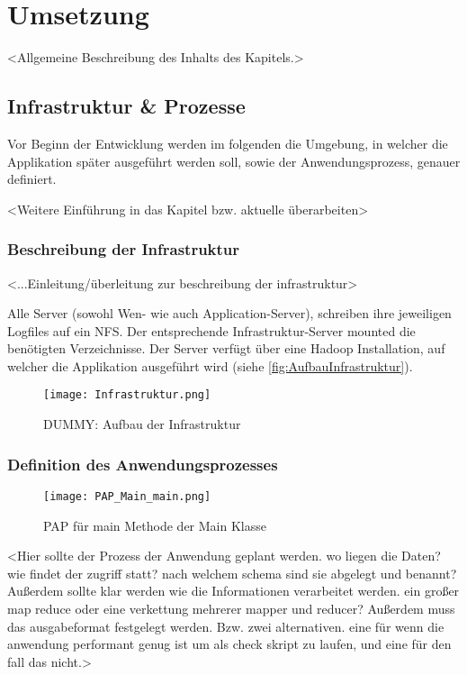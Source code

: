 
\chapter{Umsetzung}\label{cha:Umsetzung}
<Allgemeine Beschreibung des Inhalts des Kapitels.>

\section{Infrastruktur \& Prozesse}
Vor Beginn der Entwicklung werden im folgenden die Umgebung, in welcher die Applikation später ausgeführt werden soll, sowie der Anwendungsprozess, genauer definiert. 

<Weitere Einführung in das Kapitel bzw. aktuelle überarbeiten>

\subsection{Beschreibung der Infrastruktur}
<...Einleitung/überleitung zur beschreibung der infrastruktur>

Alle Server (sowohl Wen- wie auch Application-Server), schreiben ihre jeweiligen Logfiles auf ein \ac{NFS}. Der entsprechende Infrastruktur-Server mounted die benötigten Verzeichnisse. Der Server verfügt über eine Hadoop Installation, auf welcher die Applikation ausgeführt wird (siehe \autoref{fig:AufbauInfrastruktur}).

\begin{figure}
	\centering
	\texttt{[image: Infrastruktur.png]}
	\caption{DUMMY: Aufbau der Infrastruktur}
	\label{fig:AufbauInfrastruktur}
\end{figure}

\subsection{Definition des Anwendungsprozesses}


\begin{figure}
	\centering
	\texttt{[image: PAP\_Main\_main.png]}
	\caption{PAP für main Methode der Main Klasse}
	\label{fig:PAP_Main_main}
\end{figure}

<Hier sollte der Prozess der Anwendung geplant werden. wo liegen die Daten? wie findet der zugriff statt? nach welchem schema sind sie abgelegt und benannt? Außerdem sollte klar werden wie die Informationen verarbeitet werden. ein großer map reduce oder eine verkettung mehrerer mapper und reducer? Außerdem muss das ausgabeformat festgelegt werden. Bzw. zwei alternativen. eine für wenn die anwendung performant genug ist um als check skript zu laufen, und eine für den fall das nicht.>

